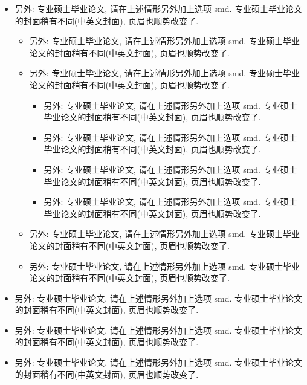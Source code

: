 \newpage
\begin{itemize}
  \item 另外: 专业硕士毕业论文, 请在上述情形另外加上选项 smd. 专业硕士毕业论文的封面稍有不同(中英文封面), 页眉也顺势改变了.
    \begin{itemize}
      \item 另外: 专业硕士毕业论文, 请在上述情形另外加上选项 smd. 专业硕士毕业论文的封面稍有不同(中英文封面), 页眉也顺势改变了.
      \item 另外: 专业硕士毕业论文, 请在上述情形另外加上选项 smd. 专业硕士毕业论文的封面稍有不同(中英文封面), 页眉也顺势改变了.
        \begin{itemize}
          \item 另外: 专业硕士毕业论文, 请在上述情形另外加上选项 smd. 专业硕士毕业论文的封面稍有不同(中英文封面), 页眉也顺势改变了.
          \item 另外: 专业硕士毕业论文, 请在上述情形另外加上选项 smd. 专业硕士毕业论文的封面稍有不同(中英文封面), 页眉也顺势改变了.
          \item 另外: 专业硕士毕业论文, 请在上述情形另外加上选项 smd. 专业硕士毕业论文的封面稍有不同(中英文封面), 页眉也顺势改变了.
          \item 另外: 专业硕士毕业论文, 请在上述情形另外加上选项 smd. 专业硕士毕业论文的封面稍有不同(中英文封面), 页眉也顺势改变了.
        \end{itemize}
      \item 另外: 专业硕士毕业论文, 请在上述情形另外加上选项 smd. 专业硕士毕业论文的封面稍有不同(中英文封面), 页眉也顺势改变了.
      \item 另外: 专业硕士毕业论文, 请在上述情形另外加上选项 smd. 专业硕士毕业论文的封面稍有不同(中英文封面), 页眉也顺势改变了.
    \end{itemize}
  \item 另外: 专业硕士毕业论文, 请在上述情形另外加上选项 smd. 专业硕士毕业论文的封面稍有不同(中英文封面), 页眉也顺势改变了.
  \item 另外: 专业硕士毕业论文, 请在上述情形另外加上选项 smd. 专业硕士毕业论文的封面稍有不同(中英文封面), 页眉也顺势改变了.
  \item 另外: 专业硕士毕业论文, 请在上述情形另外加上选项 smd. 专业硕士毕业论文的封面稍有不同(中英文封面), 页眉也顺势改变了.
\end{itemize}